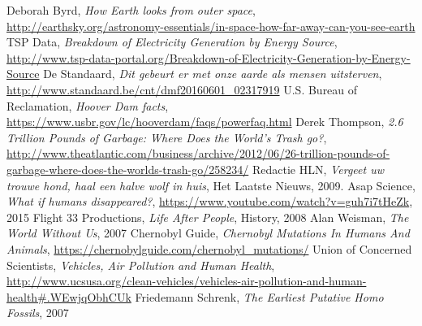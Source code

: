 \begin{thebibliography}{9}
	Deborah Byrd,
	\emph{How Earth looks from outer space},
	\url{http://earthsky.org/astronomy-essentials/in-space-how-far-away-can-you-see-earth}
	TSP Data,
	\emph{Breakdown of Electricity Generation by Energy Source},
	\url{http://www.tsp-data-portal.org/Breakdown-of-Electricity-Generation-by-Energy-Source}
		De Standaard,
		\emph{Dit gebeurt er met onze aarde als mensen uitsterven},
		\url{http://www.standaard.be/cnt/dmf20160601_02317919}
		U.S. Bureau of Reclamation,
		\emph{Hoover Dam facts},
		\url{https://www.usbr.gov/lc/hooverdam/faqs/powerfaq.html}
				Derek Thompson,
				\emph{2.6 Trillion Pounds of Garbage: Where Does the World's Trash go?},
				\url{http://www.theatlantic.com/business/archive/2012/06/26-trillion-pounds-of-garbage-where-does-the-worlds-trash-go/258234/}
  Redactie HLN,
  \emph{Vergeet uw trouwe hond, haal een halve wolf in huis},
  Het Laatste Nieuws,
  2009.
  Asap Science,
  \emph{What if humans disappeared?},
  \url{https://www.youtube.com/watch?v=guh7i7tHeZk},
  2015
	Flight 33 Productions,
    \emph{Life After People},
    History,
    2008
	Alan Weisman,
	\emph{The World Without Us},
	2007
	Chernobyl Guide,
	\emph{Chernobyl Mutations In Humans And Animals},
	\url{https://chernobylguide.com/chernobyl_mutations/}
	Union of Concerned Scientists,
	\emph{Vehicles, Air Pollution and Human Health},
	\url{http://www.ucsusa.org/clean-vehicles/vehicles-air-pollution-and-human-health#.WEwjqObhCUk}
	Friedemann Schrenk,
	\emph{The Earliest Putative Homo Fossils},
2007
	
\end{thebibliography}


